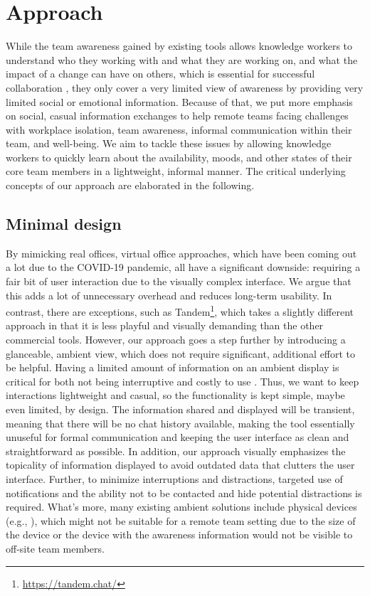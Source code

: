 \chapter{Approach}
\label{chapter:approach}
While the team awareness gained by existing tools allows knowledge workers to understand who they working with and what they are working on, and what the impact of a change can have on others, which is essential for successful collaboration \autocite{dourish1992awareness}, they only cover a very limited view of awareness by providing very limited social or emotional information. Because of that, we put more emphasis on social, casual information exchanges to help remote teams facing challenges with workplace isolation, team awareness, informal communication within their team, and well-being. We aim to tackle these issues by allowing knowledge workers to quickly learn about the availability, moods, and other states of their core team members in a lightweight, informal manner. The critical underlying concepts of our approach are elaborated in the following.

\section{Minimal design}
By mimicking real offices, virtual office approaches, which have been coming out a lot due to the COVID-19 pandemic, all have a significant downside: requiring a fair bit of user interaction due to the visually complex interface. We argue that this adds a lot of unnecessary overhead and reduces long-term usability. In contrast, there are exceptions, such as Tandem\footnote{\url{https://tandem.chat/}}, which takes a slightly different approach in that it is less playful and visually demanding than the other commercial tools. However, our approach goes a step further by introducing a glanceable, ambient view, which does not require significant, additional effort to be helpful. Having a limited amount of information on an ambient display is critical for both not being interruptive and costly to use \autocite{dabbish2004controlling}. Thus, we want to keep interactions lightweight and casual, so the functionality is kept simple, maybe even limited, by design. The information shared and displayed will be transient, meaning that there will be no chat history available, making the tool essentially unuseful for formal communication and keeping the user interface as clean and straightforward as possible. In addition, our approach visually emphasizes the topicality of information displayed to avoid outdated data that clutters the user interface. Further, to minimize interruptions and distractions, targeted use of notifications and the ability not to be contacted and hide potential distractions is required. What's more, many existing ambient solutions include physical devices (e.g., \autocite{ downs2012ambient, alavi2012ambient, rocker2004using}), which might not be suitable for a remote team setting due to the size of the device or the device with the awareness information would not be visible to off-site team members.

